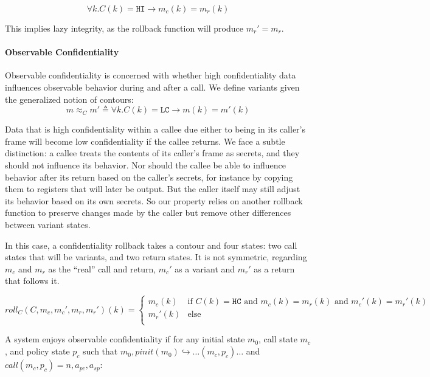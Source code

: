 \documentclass{article}
\begin{document}
      \[\forall k . C(k) = \mathtt{HI} \rightarrow m_c(k) = m_r(k)\]

      This implies lazy integrity, as the rollback function will produce \(m_r' = m_r\).
 
    \paragraph{Observable Confidentiality}

      Observable confidentiality is concerned with whether high confidentiality data influences
      observable behavior during and after a call. We define variants given the generalized notion
      of contours:
      \[m \approx_C m' \triangleq \forall k . C(k) = \mathtt{LC} \rightarrow m(k) = m'(k)\]

      Data that is high confidentiality within a callee due either to being in its caller's frame
      will become low confidentiality if the callee returns. We face a subtle distinction: 
      a callee treats the contents of its caller's frame as secrets, and they should not influence
      its behavior. Nor should the callee be able to influence behavior after its return based
      on the caller's secrets, for instance by copying them to registers that will later be output.
      But the caller itself may still adjust its behavior based on its own secrets. So our property
      relies on another rollback function to preserve changes made by the caller but remove other
      differences between variant states.

      In this case, a confidentiality rollback takes a contour and four states: two call states
      that will be variants, and two return states. It is not symmetric, regarding \(m_c\) and \(m_r\)
      as the ``real'' call and return, \(m_c'\) as a variant and \(m_r'\) as a return that follows it.

      \[\mathit{roll}_C(C,m_c,m_c',m_r,m_r')(k) =
        \begin{cases}
          m_c(k) & \text{if } C(k) = \mathtt{HC} \text{ and } m_c(k) = m_r(k) \text{ and } m_c'(k) = m_r'(k) \\
          m_r'(k) & \text{else} \\
        \end{cases}\]

      A system enjoys observable confidentiality if for any initial state \(m_0\), call state \(m_c\),
      and policy state \(p_c\) such that \(m_0,\mathit{pinit}(m_0) \hookrightarrow \dots (m_c,p_c) \dots\) and
      \(\mathit{call}(m_c,p_c) = n, a_{pc}, a_{sp}\):
\end{document}

